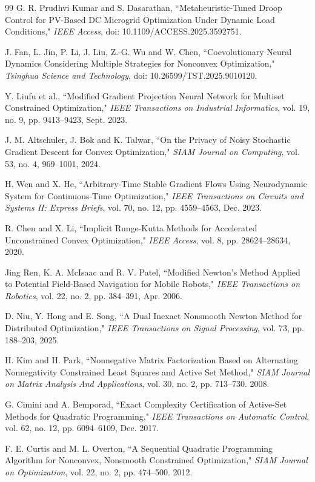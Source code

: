 \documentclass[pdflatex,sn-mathphys,Numbered]{sn-jnl}
\theoremstyle{thmstyleone}
\theoremstyle{thmstyletwo}
\theoremstyle{thmstylethree}
\begin{document}
\begin{thebibliography}{99}
 G. R. Prudhvi Kumar and S. Dasarathan, ``Metaheuristic-Tuned Droop Control for PV-Based DC Microgrid Optimization Under Dynamic Load Conditions," \emph{IEEE Access}, doi: 10.1109/ACCESS.2025.3592751.

 J. Fan, L. Jin, P. Li, J. Liu, Z.-G. Wu and W. Chen, ``Coevolutionary Neural Dynamics Considering Multiple Strategies for Nonconvex Optimization," \emph{Tsinghua Science and Technology}, doi: 10.26599/TST.2025.9010120.

  Y. Liufu et al., ``Modified Gradient Projection Neural Network for Multiset Constrained Optimization,"  \emph{IEEE Transactions on Industrial Informatics}, vol. 19, no. 9, pp. 9413--9423, Sept. 2023.

 J. M. Altschuler, J. Bok and K. Talwar, ``On the Privacy of Noisy Stochastic Gradient Descent for Convex Optimization," \emph{SIAM Journal on Computing}, vol. 53, no. 4, 969--1001, 2024.

 H. Wen and X. He, ``Arbitrary-Time Stable Gradient Flows Using Neurodynamic System for Continuous-Time Optimization," \emph{IEEE Transactions on Circuits and Systems II: Express Briefs}, vol. 70, no. 12, pp. 4559--4563, Dec. 2023.

 R. Chen and X. Li, ``Implicit Runge-Kutta Methods for Accelerated Unconstrained Convex Optimization," \emph{IEEE Access}, vol. 8, pp. 28624--28634, 2020.

 Jing Ren, K. A. McIsaac and R. V. Patel, ``Modified Newton's Method Applied to Potential Field-Based Navigation for Mobile Robots," \emph{IEEE Transactions on Robotics}, vol. 22, no. 2, pp. 384--391, Apr. 2006.

 D. Niu, Y. Hong and E. Song, ``A Dual Inexact Nonsmooth Newton Method for Distributed Optimization," \emph{IEEE Transactions on Signal Processing}, vol. 73, pp. 188--203, 2025.

 H. Kim and H. Park, ``Nonnegative Matrix Factorization Based on Alternating Nonnegativity Constrained Least Squares and Active Set Method," \emph{SIAM Journal on Matrix Analysis And Applications}, vol. 30, no. 2, pp. 713--730. 2008.

 G. Cimini and A. Bemporad, ``Exact Complexity Certification of Active-Set Methods for Quadratic Programming," \emph{IEEE Transactions on Automatic Control}, vol. 62, no. 12, pp. 6094--6109, Dec. 2017.

 F. E. Curtis and M. L. Overton, ``A Sequential Quadratic Programming Algorithm for Nonconvex, Nonsmooth Constrained Optimization," \emph{SIAM Journal on Optimization}, vol. 22, no. 2, pp. 474--500. 2012.


\end{thebibliography}
\end{document}
